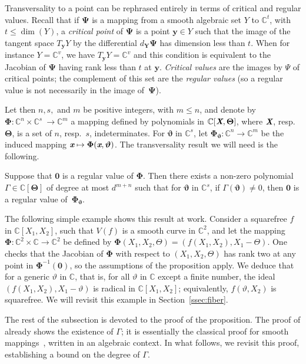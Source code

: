 \documentclass[sigconf]{acmart}
\def\Xb{\textit{\textbf{X}}}
\def\Thetab{\bm{\Theta}}
\def\thetab{\bm{\vartheta}}
\def\xb{\textit{\textbf{x}}}
\def\C{\mathbb{C}}
\def\dt{s}
\begin{document}
Transversality to a point can be rephrased entirely in terms of
critical and regular values. Recall that if $\bm \Psi$ is a mapping
from a smooth algebraic set $Y$ to $\C^t$, with $t\le \dim(Y)$, a {\em
  critical point} of $\bm \Psi$ is a point $\bm y \in Y$ such that the
image of the tangent space $T_{\bm y} Y$ by the differential $d_{\bm
  Y} \bm \Psi$ has dimension less than $t$. When for instance
$Y=\C^v$, we have $T_{\bm y} Y=\C^v$ and this condition is equivalent
to the Jacobian of $\bm \Psi$ having rank less than $t$ at $\bm y$.
{\em Critical values} are the images by $\Psi$ of critical points; the
complement of this set are the {\em regular values} (so a regular
value is not necessarily in the image of~$\bm\Psi$).

Let then $n,\dt,$ and $m$ be positive integers, with $m \le n$, and denote
by $\bm\Phi :\C^n \times \C^{\dt} ~ \rightarrow \C^{m}$ a mapping
defined by polynomials in $\C[\Xb,\Thetab]$, where $\Xb$,
resp.\ $\Thetab$, is a set of $n$, resp.\ $\dt$, indeterminates.  For
$\thetab$ in $\C^{\dt}$, let $\bm\Phi_{\thetab} : \C^n \rightarrow
\C^{m}$ be the induced mapping $\xb\mapsto \bm\Phi(\xb,\thetab)$.  The
transversality result we will need is the following.

\begin{proposition} \label{prop:weak_t}
  Suppose that $\bm 0$ is a regular value of $\bm\Phi$. Then there
  exists a non-zero polynomial $\Gamma \in \C[\Thetab]$ of degree at
  most $d^{m+n}$ such that for $\thetab$ in $\C^\dt$, if
  $\Gamma(\thetab)\ne 0$, then $\bm 0$ is a regular value
  of~$\bm\Phi_{\thetab}$.
\end{proposition}

The following simple example shows this result at work. Consider a
squarefree $f$ in $\C[X_1,X_2]$, such that $V(f)$ is a smooth curve in
$\C^2$, and let the mapping $\bm\Phi:\C^2\times \C \to \C^2$ be
defined by $\bm\Phi(X_1,X_2,\Theta) = (f(X_1,X_2), X_1-\Theta)$. One
checks that the Jacobian of $\bm\Phi$ with respect to
$(X_1,X_2,\Theta)$ has rank two at any point in $\bm\Phi^{-1}(\bm 0)$,
so the assumptions of the proposition apply. We deduce that for a
generic $\vartheta$ in $\C$, that is, for all $\vartheta$ in $\C$
except a finite number, the ideal $(f(X_1,X_2), X_1-\vartheta)$ is
radical in $\C[X_1,X_2]$; equivalently, $f(\vartheta, X_2)$ is
squarefree. We will revisit this example in Section~\ref{ssec:fiber}.

The rest of the subsection is devoted to the proof of the proposition.
The proof of \cite[Theorem B.3]{TWT} already shows the existence of
$\Gamma$; it is essentially the classical proof for smooth
mappings~\cite[Section~3.7]{demazure2000bifurcations}, written in an
algebraic context. In what follows, we revisit this proof,
establishing a bound on the degree of $\Gamma$.
\end{document}
